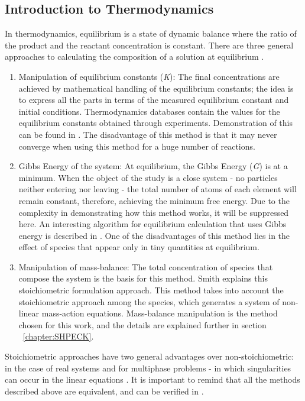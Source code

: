 \subsection{Introduction to Thermodynamics}
In thermodynamics, equilibrium is a state of dynamic balance where the ratio of the product and the reactant concentration is constant. There are three general approaches to calculating the composition of a solution at equilibrium \cite{Petrucci:07}.
\begin{enumerate}
    \item Manipulation of equilibrium constants (\emph{K}): The final concentrations are achieved by mathematical handling of the equilibrium constants; the idea is to express all the parts in terms of the measured equilibrium constant and initial conditions. Thermodynamics databases contain the values for the equilibrium constants obtained through experiments. Demonstration of this can be found in \cite{Kehew:00}. The disadvantage of this method is that it may never converge when using this method for a huge number of reactions.
    \item Gibbs Energy of the system: At equilibrium, the Gibbs Energy (\emph{G}) is at a minimum. When the object of the study is a close system - no particles neither entering nor leaving - the total number of atoms of each element will remain constant, therefore, achieving the minimum free energy. Due to the complexity in demonstrating how this method works, it will be suppressed here. An interesting algorithm for equilibrium calculation that uses Gibbs energy is described in \cite{Allan:15}. One of the disadvantages of this method lies in the effect of species that appear only in tiny quantities at equilibrium.
    \item Manipulation of mass-balance: The total concentration of species that compose the system is the basis for this method. Smith \cite{Smith:80} explains this stoichiometric formulation approach. This method takes into account the stoichiometric approach among the species, which generates a system of non-linear mass-action equations. Mass-balance manipulation is the method chosen for this work, and the details are explained further in section ~\ref{chapter:SHPECK}.
\end{enumerate}

Stoichiometric approaches have two general advantages over non-stoichiometric: in the case of real systems and for multiphase problems - in which singularities can occur in the linear equations \cite{Smith:80}. It is important to remind that all the methods described above are equivalent, and can be verified in \cite{Zeggeren:70}.

